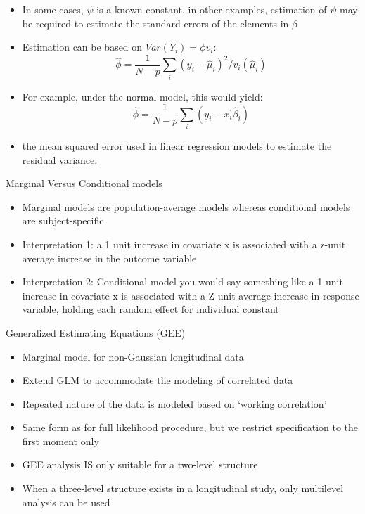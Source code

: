\documentclass{beamer}
\begin{document}
\begin{frame}{}
\begin{itemize}
	\item In some cases, $\psi$ is a known constant, in other examples, estimation of $\psi$ may be	required to estimate the standard errors of the elements in $\beta$
	\item Estimation can be based on $Var(Y_i)=\phi v_i$:
	\[\hat{\phi}=\frac{1}{N-p}\sum_{i}(y_i-\hat{\mu}_i)^{2}/v_i(\hat{\mu}_i) \]
	\item For example, under the normal model, this would yield:
		\[\hat{\phi}=\frac{1}{N-p}\sum_{i}(y_i-x^{'}_i\hat{\beta}_i)\]
	\item the mean squared error used in linear regression models to estimate the residual variance.
\end{itemize}
\end{frame}

\begin{frame}{Marginal Versus Conditional models}
\begin{itemize}
	\item Marginal models are population-average models whereas conditional models are subject-specific \vspace{0.25cm}
	\item Interpretation 1: a 1 unit increase in covariate x is associated with a z-unit average increase in the outcome variable \vspace{0.25cm}
	\item Interpretation 2: Conditional model you would say something like a 1 unit increase in covariate x is associated with a Z-unit average increase in response variable, holding each random effect for individual constant
\end{itemize}
\end{frame}

\begin{frame}{Generalized Estimating Equations (GEE)}
\begin{itemize}
	\item Marginal model for non-Gaussian longitudinal data
	\item Extend GLM to accommodate the modeling of correlated data
	\item Repeated nature of the data is modeled based on `working correlation' \vspace{0.25cm}
	\item Same form as for full likelihood procedure, but we restrict specification to the first moment only \vspace{0.25cm}
	\item GEE analysis IS only suitable for a two-level structure \vspace{0.25cm}
	\item When a three-level structure exists in a longitudinal study, only multilevel analysis can be used
\end{itemize}
\end{frame}
\end{document}
